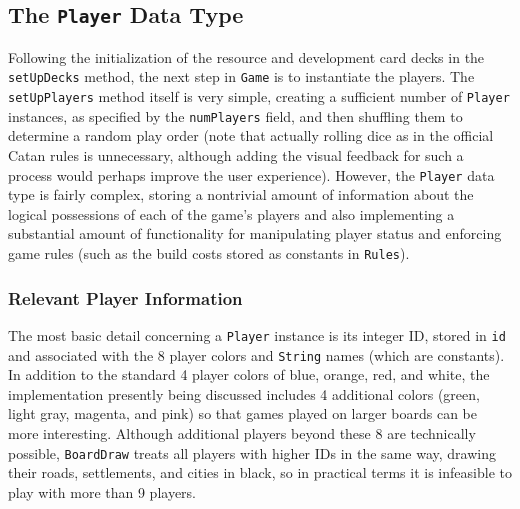 \documentclass[pageno]{jpaper}
\begin{document}
\begin{doublespacing}
\hypertarget{sec:the_player_data_type}{}
\subsection{The \lstinline$Player$ Data Type}

Following the initialization of the resource and development card decks in the \lstinline$setUpDecks$ method, the next step in \lstinline$Game$ is to instantiate the players. The \lstinline$setUpPlayers$ method itself is very simple, creating a sufficient number of \lstinline$Player$ instances, as specified by the \lstinline$numPlayers$ field, and then shuffling them to determine a random play order (note that actually rolling dice as in the official Catan rules is unnecessary, although adding the visual feedback for such a process would perhaps improve the user experience). However, the \lstinline$Player$ data type is fairly complex, storing a nontrivial amount of information about the logical possessions of each of the game's players and also implementing a substantial amount of functionality for manipulating player status and enforcing game rules (such as the build costs stored as constants in \lstinline$Rules$).

\hypertarget{sec:relevant_player_information}{}
\subsubsection{Relevant Player Information}

The most basic detail concerning a \lstinline$Player$ instance is its integer ID, stored in \lstinline$id$ and associated with the 8 player colors and \lstinline$String$ names (which are constants). In addition to the standard 4 player colors of blue, orange, red, and white, the implementation presently being discussed includes 4 additional colors (green, light gray, magenta, and pink) so that games played on larger boards can be more interesting. Although additional players beyond these 8 are technically possible, \lstinline$BoardDraw$ treats all players with higher IDs in the same way, drawing their roads, settlements, and cities in black, so in practical terms it is infeasible to play with more than 9 players. 


\end{doublespacing}
\end{document}
